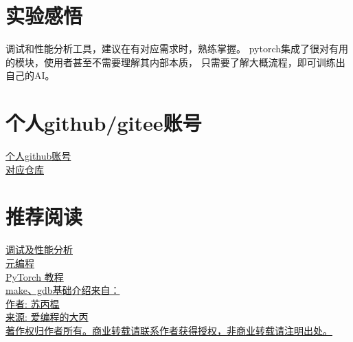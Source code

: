 \documentclass[UTF8]{ctexart}
\begin{document}
\section{实验感悟}
调试和性能分析工具，建议在有对应需求时，熟练掌握。
pytorch集成了很对有用的模块，使用者甚至不需要理解其内部本质，
只需要了解大概流程，即可训练出自己的AI。


\section{个人github/gitee账号}
\href{https://github.com/sufwis}{个人github账号}\\
\indent \href{https://github.com/sufwis/development-tools-learn.git}{对应仓库}

\section{推荐阅读}
\href{https://missing-semester-cn.github.io/2020/debugging-profiling/}{调试及性能分析}
\\
\indent \href{https://missing-semester-cn.github.io/2020/metaprogramming/}{元编程}
\\
\indent \href{https://www.runoob.com/pytorch/pytorch-tutorial.html}{PyTorch 教程}
\\
\indent \href{https://subingwen.cn/}{make、gdb基础介绍来自：\\\indent \qquad 作者: 苏丙榅\\
\indent \qquad 来源: 爱编程的大丙\\
\indent \qquad 著作权归作者所有。商业转载请联系作者获得授权，非商业转载请注明出处。
}
\end{document}
